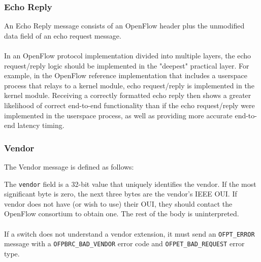 \subsubsection{Echo Reply}
An Echo Reply message consists of an OpenFlow header plus the unmodified data field of an echo request message.
\\\\
In an OpenFlow protocol implementation divided into multiple layers, the echo request/reply logic should be implemented in the "deepest" practical layer.  For example, in the OpenFlow reference implementation that includes a userspace process that relays to a kernel module, echo request/reply is implemented in the kernel module.  Receiving a correctly formatted echo reply then shows a greater likelihood of correct end-to-end functionality than if the echo request/reply were implemented in the userspace process, as well as providing more accurate end-to-end latency timing.

\subsubsection{Vendor}
The Vendor message is defined as follows:


The \verb|vendor| field is a 32-bit value that uniquely identifies the vendor. If the most significant byte is zero, the next three bytes are the vendor's IEEE OUI. If vendor does not have (or wish to use) their OUI, they should contact the OpenFlow consortium to obtain one. The rest of the body is uninterpreted.
\\\\
If a switch does not understand a vendor extension, it must send an \verb|OFPT_ERROR| message with a \verb|OFPBRC_BAD_VENDOR| error code and \verb|OFPET_BAD_REQUEST| error type. 


